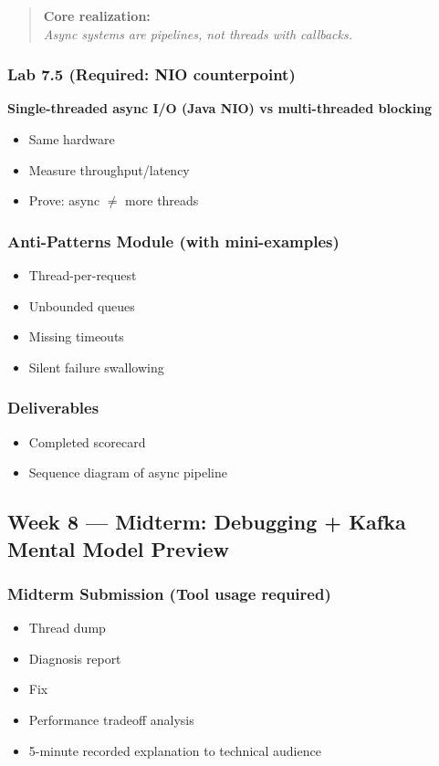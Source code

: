 \documentclass[11pt,a4paper]{article}
\begin{document}
	\begin{quote}
		\textbf{Core realization:}\\
		\textit{Async systems are pipelines, not threads with callbacks.}
	\end{quote}
	
	\subsubsection*{Lab 7.5 (Required: NIO counterpoint)}
	\textbf{Single-threaded async I/O (Java NIO) vs multi-threaded blocking}
	\begin{itemize}[leftmargin=*]
		\item Same hardware
		\item Measure throughput/latency
		\item Prove: async $\neq$ more threads
	\end{itemize}
	
	\subsubsection*{Anti-Patterns Module (with mini-examples)}
	\begin{itemize}[leftmargin=*]
		\item Thread-per-request
		\item Unbounded queues
		\item Missing timeouts
		\item Silent failure swallowing
	\end{itemize}
	
	\subsubsection*{Deliverables}
	\begin{itemize}[leftmargin=*]
		\item Completed scorecard
		\item Sequence diagram of async pipeline
	\end{itemize}
	
	\subsection*{Week 8 --- Midterm: Debugging + Kafka Mental Model Preview}
	
	\subsubsection*{Midterm Submission (Tool usage required)}
	\begin{itemize}[leftmargin=*]
		\item Thread dump
		\item Diagnosis report
		\item Fix
		\item Performance tradeoff analysis
		\item 5-minute recorded explanation to technical audience
	\end{itemize}
	
\end{document}
